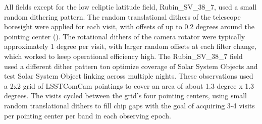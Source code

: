 All fields except for the low ecliptic latitude field, Rubin\_SV\_38\_7, used a small random dithering pattern.
The random translational dithers of the telescope boresight were applied for each visit, with offsets of up to 0.2 degrees around the pointing center (). 
The rotational dithers of the camera rotator were typically approximately 1 degree per visit, with larger random offsets at each filter change, which worked to keep operational efficiency high. 
The Rubin\_SV\_38\_7 field used a different dither pattern ton optimize coverage of Solar System Objects and test Solar System Object linking across multiple nights. These
observations used a 2x2 grid of LSSTComCam pointings to cover an area of about 1.3 degree x 1.3 degrees.
The visits cycled between the grid's four pointing centers, using small random translational dithers to fill chip gaps with the goal of acquiring 3-4 visits per pointing center per band in each observing epoch.

